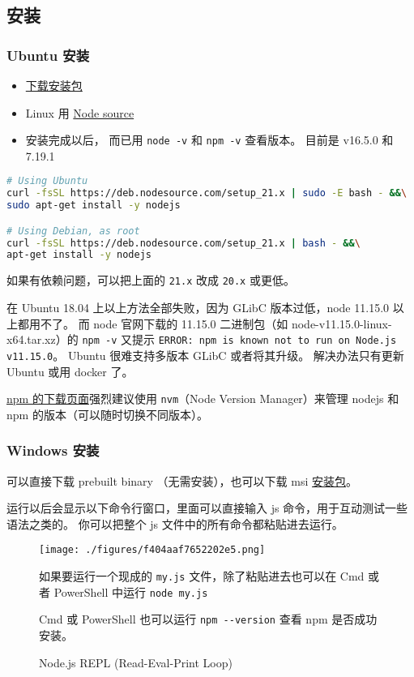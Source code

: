 

\subsection{安装}
\subsubsection{Ubuntu 安装}
\begin{itemize}
\item \href{https://nodejs.org/en/download/package-manager/}{下载安装包}
\item Linux 用 \href{https://github.com/nodesource/distributions/blob/master/README.md#installation-instructions}{Node source}
\item 安装完成以后， 而已用 \verb`node -v` 和 \verb`npm -v` 查看版本。 目前是 v16.5.0 和 7.19.1
\end{itemize}
\begin{lstlisting}[language=bash]
# Using Ubuntu
curl -fsSL https://deb.nodesource.com/setup_21.x | sudo -E bash - &&\
sudo apt-get install -y nodejs

# Using Debian, as root
curl -fsSL https://deb.nodesource.com/setup_21.x | bash - &&\
apt-get install -y nodejs
\end{lstlisting}
如果有依赖问题，可以把上面的 \verb`21.x` 改成 \verb`20.x` 或更低。

在 Ubuntu 18.04 上以上方法全部失败，因为 GLibC 版本过低，node 11.15.0 以上都用不了。 而 node 官网下载的 11.15.0 二进制包（如 node-v11.15.0-linux-x64.tar.xz）的 \verb`npm -v` 又提示 \verb`ERROR: npm is known not to run on Node.js v11.15.0`。 Ubuntu 很难支持多版本 GLibC 或者将其升级。 解决办法只有更新 Ubuntu 或用 docker 了。

\href{https://docs.npmjs.com/downloading-and-installing-node-js-and-npm}{npm 的下载页面}强烈建议使用 \verb`nvm`（Node Version Manager）来管理 nodejs 和 npm 的版本（可以随时切换不同版本）。

\subsubsection{Windows 安装}
\begin{itemize}
\item 可以直接下载 prebuilt binary （无需安装），也可以下载 msi \href{https://nodejs.org/en/download/prebuilt-installer}{安装包}。
\item 运行以后会显示以下命令行窗口，里面可以直接输入 js 命令，用于互动测试一些语法之类的。 你可以把整个 js 文件中的所有命令都粘贴进去运行。
\begin{figure}[ht]
\centering
\texttt{[image: ./figures/f404aaf7652202e5.png]}
\caption{Node.js REPL (Read-Eval-Print Loop)} \label{fig_NodeJS_1}
\item 如果要运行一个现成的 \verb`my.js` 文件，除了粘贴进去也可以在 Cmd 或者 PowerShell 中运行 \verb`node my.js`
\item Cmd 或 PowerShell 也可以运行 \verb`npm --version` 查看 npm 是否成功安装。
\end{figure}
\end{itemize}

